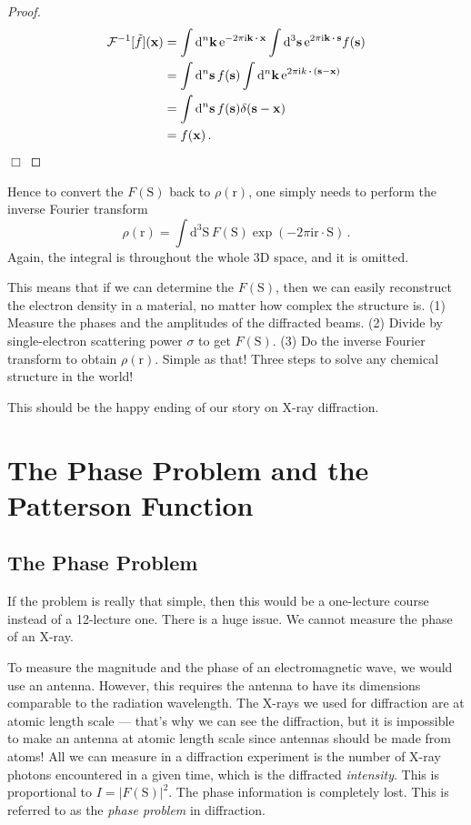 \documentclass{article}
\theoremstyle{plain}\theoremheaderfont{\normalfont\itshape}\theorembodyfont{\rmfamily}\theoremseparator{.}\newtheorem*{rem}{Remark}\newtheorem*{ex}{Example}\newtheorem*{proof}{Proof}\newtheorem*{altp}{Alternative proof}
\theoremstyle{plain}\theoremheaderfont{\normalfont\bfseries}\theorembodyfont{\rmfamily}\theoremseparator{.}\newtheorem{thm}{Theorem}[section]\newtheorem{lem}[thm]{Lemma}\newtheorem{prop}[thm]{Proposition}\newtheorem*{cor}{Corollary}\newtheorem{defn}[thm]{Definition}\newtheorem{clm}[thm]{Claim}\newtheorem{clminproof}{Claim}\newtheorem*{law}{Law}\newtheorem{pos}[thm]{Postulate}
\theoremstyle{break}\theoremheaderfont{\normalfont\itshape}\theorembodyfont{\rmfamily}\theoremseparator{.\medskip}\newtheorem*{proofskip}{Proof}\newtheorem*{exs}{Examples}\newtheorem*{rems}{Remarks}
\theoremstyle{break}\theoremheaderfont{\normalfont\bfseries}\theorembodyfont{\rmfamily}\theoremseparator{.\medskip}\newtheorem{lemskip}[thm]{Lemma}\newtheorem{defnskip}[thm]{Definition}\newtheorem{propskip}[thm]{Proposition}\newtheorem{thmskip}[thm]{Theorem}
\numberwithin{equation}{section}
\newcommand{\qed}{\hfill\ensuremath{\Box}}
\newcommand{\ii}{\mathrm{i}}
\newcommand{\ee}{\mathrm{e}}
\newcommand{\dd}[2][]{\mathrm{d}^{#1} #2\,}
\newcommand{\vb}[1]{\bm{\mathrm{#1}}}
\newcommand{\vdot}{\,\bm{\mathrm{\cdot}}\,}
\newcommand{\abs}[1]{\left| #1 \right|}
\begin{document}
    \begin{proof}
        \begin{align}
            \mathcal{F}^{-1}[\tilde{f}](\vb{x})&=\int\dd[n]{\vb{k}}\ee^{-2\pi \ii\vb{k}\vdot\vb{x}}\int\dd[3]{\vb{s}}\ee^{2\pi \ii\vb{k}\vdot\vb{s}}f(\vb{s})\notag \\
            &=\int\dd[n]{\vb{s}}f(\vb{s})\int\dd[n]{\vb{k}}\ee^{2\pi \ii k\vdot(\vb{s}-\vb{x})}\notag\\
            &=\int\dd[n]{\vb{s}}f(\vb{s})\delta(\vb{s}-\vb{x})\notag\\
            &=f(\vb{x})\,.
        \end{align}\qed
    \end{proof}
    Hence to convert the \(F(\vb{S})\) back to \(\rho(\vb{r})\), one simply needs to perform the inverse Fourier transform
    \begin{equation}
        \rho(\vb{r})=\int\dd[3]{\vb{S}}F(\vb{S})\exp(-2\pi \ii\vb{r}\vdot\vb{S})\,.
    \end{equation}
    Again, the integral is throughout the whole 3D space, and it is omitted.

    This means that if we can determine the \(F(\vb{S})\), then we can easily reconstruct the electron density in a material, no matter how complex the structure is. (1) Measure the phases and the amplitudes of the diffracted beams. (2) Divide by single-electron scattering power \(\sigma\) to get \(F(\vb{S})\). (3) Do the inverse Fourier transform to obtain \(\rho(\vb{r})\). Simple as that! Three steps to solve any chemical structure in the world!

    This should be the happy ending of our story on X-ray diffraction.

    \newpage
    \section{The Phase Problem and the Patterson Function}
    \subsection{The Phase Problem}
    If the problem is really that simple, then this would be a one-lecture course instead of a 12-lecture one. There is a huge issue. We cannot measure the phase of an X-ray.

    To measure the magnitude and the phase of an electromagnetic wave, we would use an antenna. However, this requires the antenna to have its dimensions comparable to the radiation wavelength. The X-rays we used for diffraction are at atomic length scale --- that's why we can see the diffraction, but it is impossible to make an antenna at atomic length scale since antennas should be made from atoms! All we can measure in a diffraction experiment is the number of X-ray photons encountered in a given time, which is the diffracted \textit{intensity}. This is proportional to \(I=\abs{F(\vb{S})}^2\). The phase information is completely lost. This is referred to as the \textit{phase problem} in diffraction.
\end{document}
